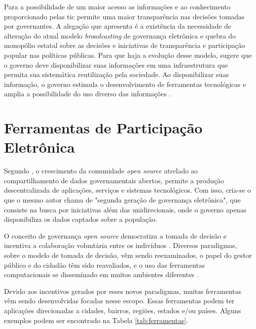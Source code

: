 \vspace{0.3CM}
\par
Para  a possibilidade de um maior acesso as informações e ao conhecimento proporcionado pelas \acrshort{tic}
permite uma maior transparência nas decisões tomadas por governantes. A alegação que  apresenta é a existência da necessidade de alteração do atual modelo
\textit{broadcasting} de governança eletrônica e quebra do monopólio estatal sobre as decisões e iniciativas de transparência e participação popular nas políticas públicas.
Para que haja a evolução desse modelo,  sugere que o governo deve disponibilizar suas informações em uma infraestrutura que permita sua sistemática reutilização
pela sociedade. Ao disponibilizar suas informação, o governo estimula o desenvolvimento de ferramentas tecnológicas e amplia a possibilidade 
do uso diverso das informações \cite{zuiderwijk2012socio}.

\section{Ferramentas de Participação Eletrônica}
\label{sec:e-part tools}
Segundo , o crescimento da comunidade \textit{open source} atrelado ao compartilhamento de dados governamentais abertos, permite a produção
descentralizada de aplicações, serviços e sistemas tecnológicos. Com isso, cria-se o que o mesmo autor chama de "segunda geração de governança eletrônica", que consiste na busca
por iniciativas além das unidirecionais, onde o governo apenas disponibiliza os dados captados sobre a população.

\par
O conceito de governança \textit{open source} democratiza a tomada de decisão e incentiva a colaboração voluntária entre os indivíduos \cite{rushkoff2003open}.
Diversos paradigmas, sobre o modelo de tomada de decisão, vêm sendo reexaminados, o papel do gestor público e do cidadão têm sido reavaliados,
e o uso das ferramentas computacionais se disseminado em muitos ambientes diferentes \cite{medeiros2009novos}.

\par
Devido aos incentivos gerados por esses novos paradigmas, muitas ferramentas vêm sendo desenvolvidas focadas nesse escopo.
Essas ferramentas podem ter aplicações direcionadas a cidades, bairros, regiões, estados e/ou países.  
Alguns exemplos podem ser encontrado na Tabela \ref{tab:ferramentas}.

